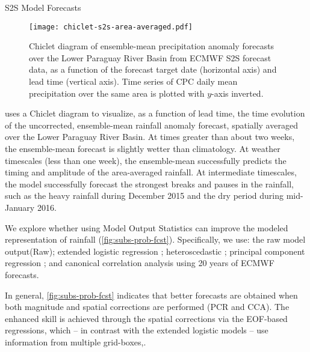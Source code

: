 \begin{block}{S2S  Model Forecasts}
  \begin{mdframed}
  \begin{figure}
    \caption{
      Chiclet diagram of ensemble-mean precipitation anomaly forecasts over the Lower Paraguay River Basin from ECMWF S2S forecast data, as a function of the forecast target date (horizontal axis) and lead time (vertical axis).
      Time series of CPC daily mean precipitation over the same area is plotted with $y$-axis inverted.
  	}
    \noindent\texttt{[image: chiclet-s2s-area-averaged.pdf]}
  	\label{fig:chiclet}
  \end{figure}
  \end{mdframed}

   uses a Chiclet diagram to visualize, as a function of lead time, the time evolution of the uncorrected, ensemble-mean rainfall anomaly forecast, spatially averaged over the Lower Paraguay River Basin.
  At times greater than about two weeks, the ensemble-mean forecast is slightly wetter than climatology.
  At weather timescales (less than one week), the ensemble-mean successfully predicts the timing and amplitude of the area-averaged rainfall.
  At intermediate timescales, the model successfully forecast the strongest breaks and pauses in the rainfall, such as the heavy rainfall during December 2015 and the dry period during mid-January 2016.

  \vspace{0.5cm}

  We explore whether using Model Output Statistics \cite[MOS;][]{Glahn:1972vt} can improve the modeled representation of rainfall (\cref{fig:subs-prob-fcst}).
  Specifically, we use: the raw model output(Raw); extended logistic regression \cite[XLR;][]{Wilks:2009bk}; heteroscedastic \cite[HXLR;][]{Messner:2014gp}; principal component regression \cite[PCR;][]{Mason:2008da,Wilks:2006fx}; and canonical correlation analysis \cite[CCA;][]{Mason:2008da,Barnston:1992gd} using 20 years of ECMWF forecasts.

  \vspace{0.5cm}

  In general, \cref{fig:subs-prob-fcst} indicates that better forecasts are obtained when both magnitude and spatial corrections are performed (PCR and CCA).
  The enhanced skill is achieved through the spatial corrections via the EOF-based regressions, which -- in contrast with the extended logistic models -- use information from multiple grid-boxes,.


\end{block}
